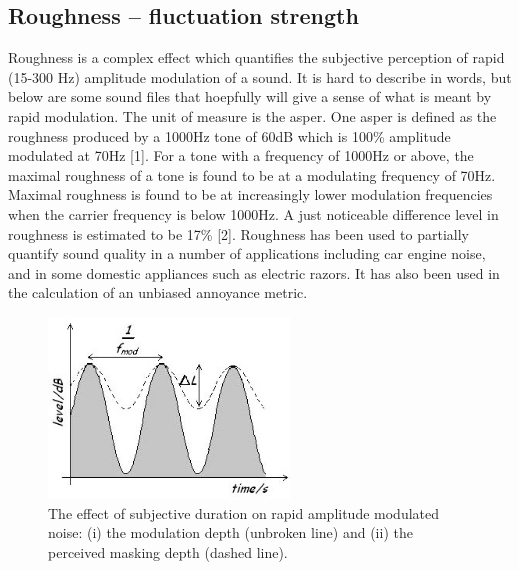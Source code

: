 %
%

%
\subsection*{Roughness -- fluctuation
strength}\label{roughness-fluctuation-strength}

Roughness is a complex effect which quantifies the subjective perception
of rapid (15-300 Hz) amplitude modulation of a sound. It is hard to
describe in words, but below are some sound files that hoepfully will
give a sense of what is meant by rapid modulation. The unit of measure
is the asper. One asper is defined as the roughness produced by a 1000Hz
tone of 60dB which is 100\% amplitude modulated at 70Hz {[}1{]}. For a
tone with a frequency of 1000Hz or above, the maximal roughness of a
tone is found to be at a modulating frequency of 70Hz. Maximal roughness
is found to be at increasingly lower modulation frequencies when the
carrier frequency is below 1000Hz. A just noticeable difference level in
roughness is estimated to be 17\% {[}2{]}. Roughness has been used to
partially quantify sound quality in a number of applications including
car engine noise, and in some domestic appliances such as electric
razors. It has also been used in the calculation of an unbiased
annoyance metric.

\begin{figure}[h]
\centering
\includegraphics[width=2.525in]{img/model-of-roughness-masking_002.jpg}
\caption{The effect of subjective duration on rapid amplitude
modulated noise: (i) the modulation depth (unbroken line) and (ii) the
perceived masking depth (dashed line).}
\end{figure}

